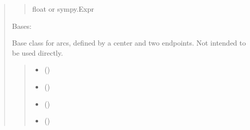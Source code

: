 \documentclass[letterpaper,10pt,english]{sphinxmanual}
\begin{document}
\begin{quote}
\begin{fulllineitems}
\begin{fulllineitems}
\begin{quote}
\begin{description}
\sphinxAtStartPar
float or sympy.Expr

\end{description}\end{quote}

\end{fulllineitems}


\end{fulllineitems}


\begin{fulllineitems}
\label{\detokenize{pygeox:pygeox.basic_objects.BaseArc}}
\pysigstartsignatures
\pysiglinewithargsret
{}
{\sphinxparamcomma {}\sphinxparamcomma {}\sphinxparamcomma {}\sphinxparamcomma {}}
{}
\pysigstopsignatures
\sphinxAtStartPar
Bases: 

\sphinxAtStartPar
Base class for arcs, defined by a center and two endpoints.
Not intended to be used directly.
\begin{quote}\begin{description}
\begin{itemize}
\item {} 
\sphinxAtStartPar
{} ()

\item {} 
\sphinxAtStartPar
{} ()

\item {} 
\sphinxAtStartPar
{} ()

\item {} 
\sphinxAtStartPar
{} (\sphinxstyleliteralemphasis{\sphinxupquote{ | }})


\end{itemize}
\end{description}
\end{quote}
\end{fulllineitems}
\end{quote}
\end{document}
